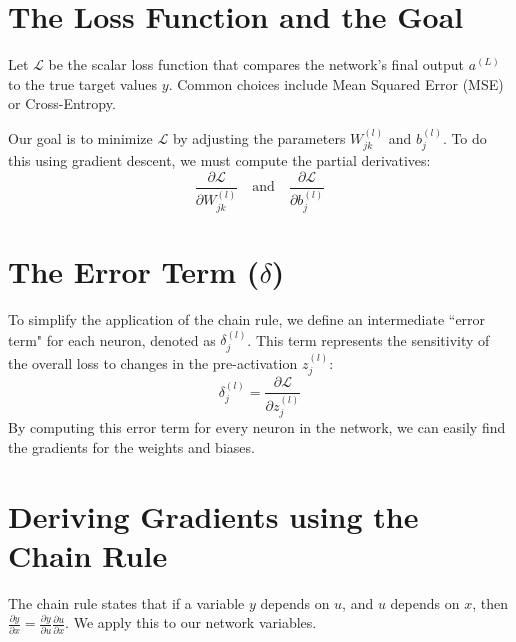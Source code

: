 \documentclass[11pt,a4paper]{article}
\begin{document}
\section{The Loss Function and the Goal}

Let $\mathcal{L}$ be the scalar loss function that compares the network's final output $a^{(L)}$ to the true target values $y$. Common choices include Mean Squared Error (MSE) or Cross-Entropy. 

Our goal is to minimize $\mathcal{L}$ by adjusting the parameters $W_{jk}^{(l)}$ and $b_j^{(l)}$. To do this using gradient descent, we must compute the partial derivatives:
\begin{equation}
	\frac{\partial \mathcal{L}}{\partial W_{jk}^{(l)}} \quad \text{and} \quad \frac{\partial \mathcal{L}}{\partial b_j^{(l)}}
\end{equation}

\section{The Error Term ($\delta$)}

To simplify the application of the chain rule, we define an intermediate ``error term" for each neuron, denoted as $\delta_j^{(l)}$. This term represents the sensitivity of the overall loss to changes in the pre-activation $z_j^{(l)}$:
\begin{equation}
	\delta_j^{(l)} = \frac{\partial \mathcal{L}}{\partial z_j^{(l)}}
\end{equation}
By computing this error term for every neuron in the network, we can easily find the gradients for the weights and biases.

\section{Deriving Gradients using the Chain Rule}

The chain rule states that if a variable $y$ depends on $u$, and $u$ depends on $x$, then $\frac{\partial y}{\partial x} = \frac{\partial y}{\partial u} \frac{\partial u}{\partial x}$. We apply this to our network variables.
\end{document}

